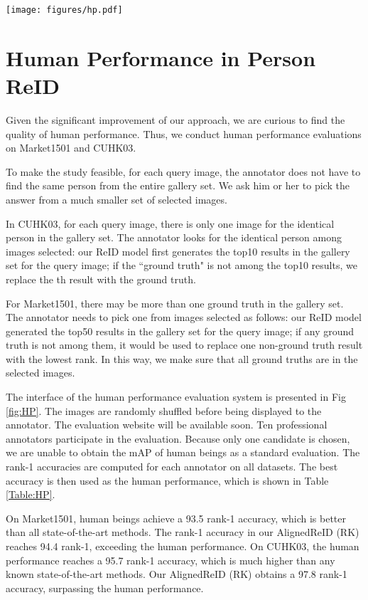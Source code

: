 \documentclass[10pt,twocolumn,letterpaper]{article}
\begin{document}
\begin{figure*}[htb]
\centering
\texttt{[image: figures/hp.pdf]}
\caption{Interface of our human performance evaluation system for CUHK03. The left side shows a query image and the right side shows 10 images sampled using our deep model.}
\label{fig:HP}
\end{figure*}


\section{Human Performance in Person ReID}
\label{humanperformance}
Given the significant improvement of our approach, we are curious to
find the quality of human performance.
Thus, we conduct human performance evaluations on Market1501 and CUHK03.

To make the study feasible, for each query image, the annotator does not have to find the same person from the entire gallery set. We ask him or her to pick the answer from a much smaller set of selected images.

In CUHK03, for each query image, there is only one image for the identical person in the gallery set.
The annotator looks for the identical person among  images selected:
our ReID model first generates the top10 results in the gallery set for the query image;
if the ``ground truth" is not among the top10 results, we replace the th result with the ground truth.

For Market1501, there may be more than one ground truth in the gallery set.
The annotator needs to pick one from  images selected as follows:
our ReID model generated the top50 results in the gallery set for the query image;
if any ground truth is not among them, it would be used to replace one non-ground truth result with the lowest rank.
In this way, we make sure that all ground truths are in the  selected images.

The interface of the human performance evaluation system is presented in Fig \ref{fig:HP}.
The images are randomly shuffled before being displayed to the annotator. The evaluation website will be available soon.
Ten professional annotators participate in the evaluation. Because only one candidate is chosen, we are unable to obtain the mAP of human beings as a standard evaluation.
The rank-1 accuracies are computed for each annotator on all datasets.
The best accuracy is then used as the human performance, which is shown in Table \ref{Table:HP}.

On Market1501, human beings achieve a 93.5 rank-1 accuracy, which is better than all state-of-the-art methods.
The rank-1 accuracy in our AlignedReID (RK) reaches 94.4 rank-1, exceeding the human performance.
On CUHK03, the human performance reaches a 95.7 rank-1 accuracy, which is much higher than any known state-of-the-art methods.
Our AlignedReID (RK) obtains a 97.8 rank-1 accuracy, surpassing the human performance.
\end{document}
